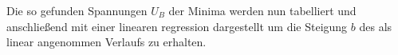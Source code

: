 \begin{center}
\begin{minipage}{\linewidth}
\label{a2a}
\end{minipage}
\begin{minipage}{\linewidth}
\centering
{}
\label{a2b}
\end{minipage}
\begin{minipage}{\linewidth}
\centering
{}
\label{a2c}
\end{minipage}
\end{center}
Die so gefunden Spannungen \(U_B\) der Minima werden nun tabelliert und anschließend mit einer linearen regression dargestellt um die Steigung \(b\) des als linear angenommen Verlaufs zu erhalten.
